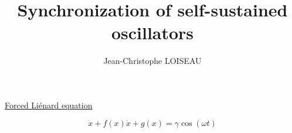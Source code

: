 \documentclass[aspectratio=169]{beamer}
\title{Synchronization of self-sustained oscillators}
\author{Jean-Christophe LOISEAU}
\institute{Arts \& Métiers Institute of Technology, January 2022}
\date{}
\begin{document}
\frame{\titlepage}

{
  \begin{frame}
    \centering
    
  \end{frame}

}


\begin{frame}
  \vfill
  \centering
  \large

  \underline{Forced Liénard equation}

  \[
  \ddot{x} + f(x) \dot{x} + g(x) = \gamma \cos(\omega t)
  \]

  \vfill
\end{frame}
\end{document}
